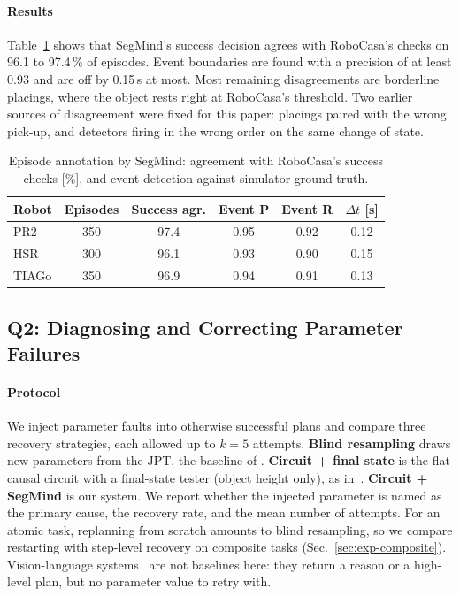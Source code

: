 \documentclass[letterpaper, 10 pt, conference]{ieeeconf}
\newcommand{\dummystyle}{\color{dummy}}
\newcommand{\dummystyle}{}
\newcommand{\dummy}[1]{{\dummystyle #1}}
\newcommand{\robocasa}{RoboCasa}
\newcommand{\segmind}{SegMind}
\begin{document}
\paragraph*{Results}
Table~\ref{tab:segmind} shows that \segmind{}'s success decision agrees with
\robocasa{}'s checks on \dummy{96.1} to \dummy{97.4}\,\% of episodes. Event
boundaries are found with a precision of at least \dummy{0.93} and are off by
\dummy{0.15}\,s at most. Most remaining disagreements are borderline placings,
where the object rests right at \robocasa{}'s threshold. Two earlier sources of
disagreement were fixed for this paper: placings paired with the wrong pick-up,
and detectors firing in the wrong order on the same change of state.

\begin{table}[t]
  \centering
  \caption{Episode annotation by \segmind{}: agreement with \robocasa{}'s
  success checks [\%], and event detection against simulator ground truth.}
  \label{tab:segmind}
  \setlength{\tabcolsep}{3.5pt}
  \dummystyle
  \begin{tabular}{lccccc}
    \toprule
    Robot & Episodes & Success agr. & Event P & Event R & $\Delta t$ [s] \\
    \midrule
    PR2   & 350 & 97.4 & 0.95 & 0.92 & 0.12 \\
    HSR   & 300 & 96.1 & 0.93 & 0.90 & 0.15 \\
    TIAGo & 350 & 96.9 & 0.94 & 0.91 & 0.13 \\
    \bottomrule
  \end{tabular}
\end{table}

\subsection{Q2: Diagnosing and Correcting Parameter Failures}
\label{sec:exp-recovery}

\paragraph*{Protocol}
We inject parameter faults into otherwise successful plans and compare three
recovery strategies, each allowed up to \dummy{$k = 5$} attempts.
\textbf{Blind resampling} draws new parameters from the JPT, the baseline of
\cite{vasantakumaar2026icc}. \textbf{Circuit + final state} is the flat causal
circuit with a final-state tester (object height only), as
in~\cite{vasantakumaar2026icc}. \textbf{Circuit + \segmind{}} is our system.
We report whether the injected parameter is named as the primary cause, the
recovery rate, and the mean number of attempts. For an atomic task, replanning
from scratch amounts to blind resampling, so we compare restarting with
step-level recovery on composite tasks (Sec.~\ref{sec:exp-composite}).
Vision-language systems~\cite{liu2023reflect,duan2024aha} are not baselines
here: they return a reason or a high-level plan, but no parameter value to
retry with.
\end{document}
